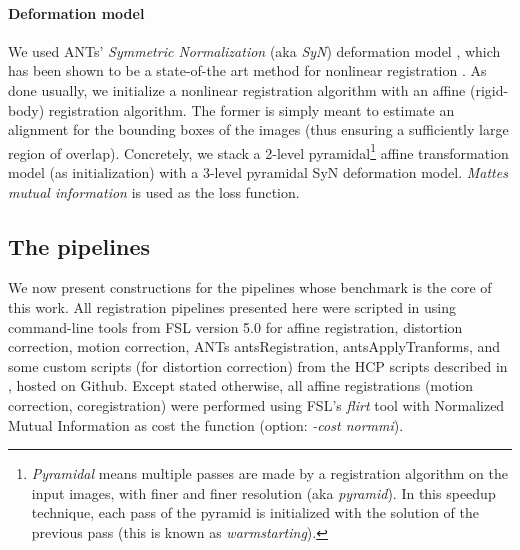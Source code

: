 \paragraph{Deformation model}
We used ANTs' \textit{Symmetric Normalization} (aka \textit{SyN})
deformation model \cite{avants2008,avants2011}, which has been shown
to be a state-of-the art method for nonlinear registration
\cite{pmid19195496}. As done usually, we initialize a nonlinear
registration algorithm with an affine (rigid-body) registration
algorithm.
%
The former is simply meant to estimate an alignment for the
bounding boxes of the images (thus ensuring a sufficiently large
region of overlap). Concretely, we stack a 2-level
pyramidal\footnote{\textit{Pyramidal} means multiple passes are
made by a registration algorithm on the input images, with finer
and finer resolution (aka \textit{pyramid}). In this speedup technique, each
pass of the pyramid is initialized with the solution of the
previous pass (this is known as \textit{warmstarting}).}  affine
transformation model (as initialization) with a 3-level pyramidal
SyN deformation model. \textit{Mattes mutual information}
\cite{mattes2003} is used as the loss function.


\subsection{The pipelines}
\label{sec:pipelines}
We now present constructions for the pipelines whose benchmark is the
core of this work. All registration pipelines presented here were
scripted in using command-line tools from FSL version 5.0
\cite{smith2004} for affine registration, distortion correction,
motion correction, ANTs \cite{avants2009advanced}
antsRegistration, antsApplyTranforms, and some custom scripts
(for distortion correction) from the HCP scripts described in
\cite{glasser2013}, hosted on Github.
Except stated otherwise, all affine registrations (motion correction,
coregistration) were performed using FSL's \textit{flirt} tool
\cite{smith2004} with Normalized Mutual Information as cost the function (option: \textit{-cost
  normmi}).

